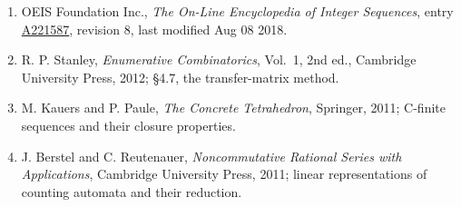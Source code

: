 \documentclass[11pt]{article}
\theoremstyle{definition}
\begin{document}
\begin{enumerate}

\item OEIS Foundation Inc., \emph{The On-Line Encyclopedia of Integer Sequences}, entry \href{https://oeis.org/A221587}{A221587}, revision 8, last modified Aug 08 2018.

\item R. P. Stanley, \emph{Enumerative Combinatorics}, Vol.~1, 2nd ed., Cambridge University Press, 2012; \S4.7, the transfer-matrix method.

\item M. Kauers and P. Paule, \emph{The Concrete Tetrahedron}, Springer, 2011; C-finite sequences and their closure properties.

\item J. Berstel and C. Reutenauer, \emph{Noncommutative Rational Series with Applications}, Cambridge University Press, 2011; linear representations of counting automata and their reduction.

\end{enumerate}
\end{document}
